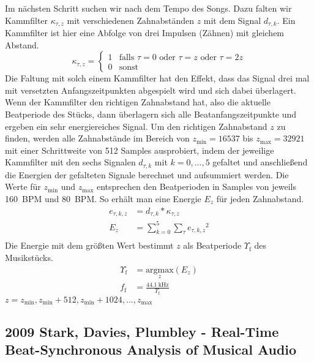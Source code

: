 {{{			%
			Im nächsten Schritt suchen wir nach dem Tempo des Songs.
			Dazu falten wir Kammfilter $\kappa_{\tau, z}$ mit verschiedenen Zahnabständen $z$ mit dem Signal $d_{\tau, k}$.
			Ein Kammfilter ist hier eine Abfolge von drei Impulsen (Zähnen) mit gleichem Abstand.
			\begin{equation}
				\kappa_{\tau, z} =
					\begin{cases}
						1 & \text{falls } \tau = 0 \text{ oder } \tau = z \text{ oder } \tau = 2z \\
						0 & \text{sonst}
					\end{cases}
			\end{equation}
			Die Faltung mit solch einem Kammfilter hat den Effekt,
				dass das Signal drei mal mit versetzten Anfangszeitpunkten abgespielt wird
				und sich dabei überlagert.
			Wenn der Kammfilter den richtigen Zahnabstand hat,
				also die aktuelle Beatperiode des Stücks,
				dann überlagern sich alle Beatanfangszeitpunkte
				und ergeben ein sehr energiereiches Signal.
			Um den richtigen Zahnabstand $z$ zu finden,
				werden alle Zahnabstände im Bereich von $z_\text{min} = \num{16537}$ bis $z_\text{max} = \num{32921}$
				mit einer Schrittweite von \num{512} Samples ausprobiert,
				indem der jeweilige Kammfilter mit den sechs Signalen $d_{\tau, k}$ mit $k = 0, ..., 5$ gefaltet
				und anschließend die Energien der gefalteten Signale berechnet und aufsummiert werden.
			Die Werte für $z_\text{min}$ und $z_\text{max}$ entsprechen den Beatperioden in Samples von jeweils \SI{160}{BPM} und \SI{80}{BPM}.
			So erhält man eine Energie $E_z$ für jeden Zahnabstand.
			\begin{align}
				e_{\tau, k, z} &= d_{\tau, k} * \kappa_{\tau, z} \\
				E_z &= \sum_{k = 0}^5 \sum_\tau {e_{\tau, k, z}}^2 \\
			\end{align}
			Die Energie mit dem größten Wert bestimmt $z$ als Beatperiode $\Upsilon_\text{f}$ des Musikstücks.
			\begin{align}
				\Upsilon_\text{f} &= \underset{z}{\text{argmax}}(E_z) \\
				f_\text{f} &= \frac{\SI{44.1}{\kilo\hertz}}{\Upsilon_\text{f}}
			\end{align}
			$z = z_\text{min}, z_\text{min} + 512, z_\text{min} + 1024, ..., z_\text{max}$
		}
	}

	\subsection{2009 Stark, Davies, Plumbley - Real-Time Beat-Synchronous Analysis of Musical Audio}
	{
}}
